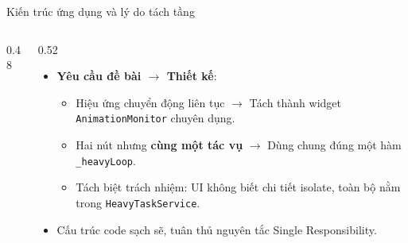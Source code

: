 \documentclass[aspectratio=169,11pt]{beamer}
\begin{document}
\begin{frame}{Kiến trúc ứng dụng và lý do tách tầng}
\begin{columns}[T]
\begin{column}{0.48\textwidth}
    \end{column}
    \begin{column}{0.52\textwidth}
      \vspace{0.15cm}
      \begin{itemize}
        \setlength{\itemsep}{0.2cm}
        \item \textbf{Yêu cầu đề bài $\rightarrow$ Thiết kế}:
        \begin{itemize}
          \item Hiệu ứng chuyển động liên tục $\rightarrow$ Tách thành widget \texttt{AnimationMonitor} chuyên dụng.
          \item Hai nút nhưng \textbf{cùng một tác vụ} $\rightarrow$ Dùng chung đúng một hàm \texttt{\_heavyLoop}.
          \item Tách biệt trách nhiệm: UI không biết chi tiết isolate, toàn bộ nằm trong \texttt{HeavyTaskService}.
        \end{itemize}
        \item Cấu trúc code sạch sẽ, tuân thủ nguyên tắc Single Responsibility.
      \end{itemize}
    \end{column}
  \end{columns}
\end{frame}
\end{document}
